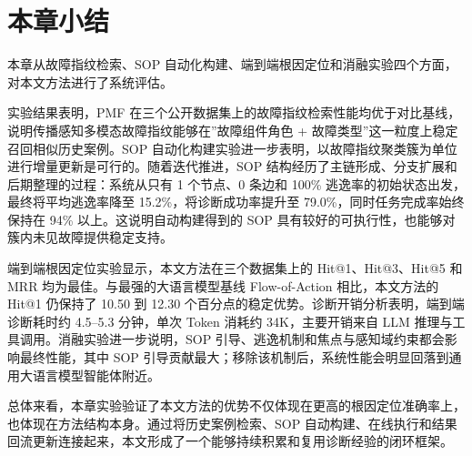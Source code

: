 
\section{本章小结}

本章从故障指纹检索、SOP 自动化构建、端到端根因定位和消融实验四个方面，对本文方法进行了系统评估。

实验结果表明，PMF 在三个公开数据集上的故障指纹检索性能均优于对比基线，说明传播感知多模态故障指纹能够在”故障组件角色 + 故障类型”这一粒度上稳定召回相似历史案例。SOP 自动化构建实验进一步表明，以故障指纹聚类簇为单位进行增量更新是可行的。随着迭代推进，SOP 结构经历了主链形成、分支扩展和后期整理的过程：系统从只有 1 个节点、0 条边和 100\% 逃逸率的初始状态出发，最终将平均逃逸率降至 15.2\%，将诊断成功率提升至 79.0\%，同时任务完成率始终保持在 94\% 以上。这说明自动构建得到的 SOP 具有较好的可执行性，也能够对簇内未见故障提供稳定支持。

端到端根因定位实验显示，本文方法在三个数据集上的 Hit@1、Hit@3、Hit@5 和 MRR 均为最佳。与最强的大语言模型基线 Flow-of-Action 相比，本文方法的 Hit@1 仍保持了 10.50 到 12.30 个百分点的稳定优势。诊断开销分析表明，端到端诊断耗时约 4.5--5.3 分钟，单次 Token 消耗约 34K，主要开销来自 LLM 推理与工具调用。消融实验进一步说明，SOP 引导、逃逸机制和焦点与感知域约束都会影响最终性能，其中 SOP 引导贡献最大；移除该机制后，系统性能会明显回落到通用大语言模型智能体附近。

总体来看，本章实验验证了本文方法的优势不仅体现在更高的根因定位准确率上，也体现在方法结构本身。通过将历史案例检索、SOP 自动构建、在线执行和结果回流更新连接起来，本文形成了一个能够持续积累和复用诊断经验的闭环框架。
